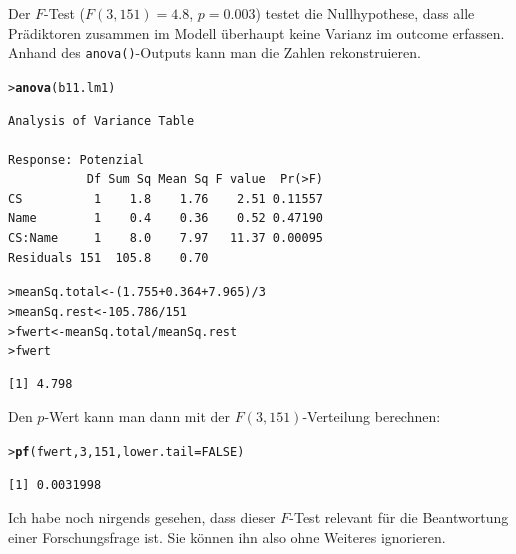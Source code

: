 \documentclass[oneside, 10pt]{book}\usepackage[]{graphicx}\usepackage[]{xcolor}
\makeatletter
\newcommand{\hlnum}[1]{\textcolor[rgb]{0.686,0.059,0.569}{#1}}%
\newcommand{\hlopt}[1]{\textcolor[rgb]{0,0,0}{#1}}%
\newcommand{\hlstd}[1]{\textcolor[rgb]{0.345,0.345,0.345}{#1}}%
\newcommand{\hlkwb}[1]{\textcolor[rgb]{0.69,0.353,0.396}{#1}}%
\newcommand{\hlkwc}[1]{\textcolor[rgb]{0.333,0.667,0.333}{#1}}%
\newcommand{\hlkwd}[1]{\textcolor[rgb]{0.737,0.353,0.396}{\textbf{#1}}}%
\newenvironment{kframe}{%
 \def\at@end@of@kframe{}%
 \ifinner\ifhmode%
  \def\at@end@of@kframe{\end{minipage}}%
  \begin{minipage}{\columnwidth}%
 \fi\fi%
 \def\FrameCommand##1{\hskip\@totalleftmargin \hskip-\fboxsep
 \colorbox{shadecolor}{##1}\hskip-\fboxsep
     \hskip-\linewidth \hskip-\@totalleftmargin \hskip\columnwidth}%
 \MakeFramed {\advance\hsize-\width
   \@totalleftmargin\z@ \linewidth\hsize
   \@setminipage}}%
 {\par\unskip\endMakeFramed%
 \at@end@of@kframe}
\newenvironment{knitrout}{}{} %
\makeatother
\begin{document}
Der $F$-Test ($F(3, 151) = 4.8$, $p = 0.003$)
testet die Nullhypothese, dass alle Prädiktoren zusammen
im Modell überhaupt keine Varianz im outcome
erfassen. Anhand des \texttt{anova()}-Outputs kann
man die Zahlen rekonstruieren.
\begin{knitrout}
\color{fgcolor}\begin{kframe}
\begin{alltt}
\hlstd{> }\hlkwd{anova}\hlstd{(b11.lm1)}
\end{alltt}
\begin{verbatim}
Analysis of Variance Table

Response: Potenzial
           Df Sum Sq Mean Sq F value  Pr(>F)
CS          1    1.8    1.76    2.51 0.11557
Name        1    0.4    0.36    0.52 0.47190
CS:Name     1    8.0    7.97   11.37 0.00095
Residuals 151  105.8    0.70                
\end{verbatim}
\begin{alltt}
\hlstd{> }\hlstd{meanSq.total} \hlkwb{<-} \hlstd{(}\hlnum{1.755} \hlopt{+} \hlnum{0.364} \hlopt{+} \hlnum{7.965}\hlstd{)} \hlopt{/} \hlnum{3}
\hlstd{> }\hlstd{meanSq.rest} \hlkwb{<-} \hlnum{105.786} \hlopt{/} \hlnum{151}
\hlstd{> }\hlstd{fwert} \hlkwb{<-} \hlstd{meanSq.total} \hlopt{/} \hlstd{meanSq.rest}
\hlstd{> }\hlstd{fwert}
\end{alltt}
\begin{verbatim}
[1] 4.798
\end{verbatim}
\end{kframe}
\end{knitrout}

Den $p$-Wert kann man dann mit der $F(3, 151)$-Verteilung
berechnen:
\begin{knitrout}
\color{fgcolor}\begin{kframe}
\begin{alltt}
\hlstd{> }\hlkwd{pf}\hlstd{(fwert,} \hlnum{3}\hlstd{,} \hlnum{151}\hlstd{,} \hlkwc{lower.tail} \hlstd{=} \hlnum{FALSE}\hlstd{)}
\end{alltt}
\begin{verbatim}
[1] 0.0031998
\end{verbatim}
\end{kframe}
\end{knitrout}

Ich habe noch nirgends gesehen, dass dieser $F$-Test
relevant für die Beantwortung einer Forschungsfrage ist.
Sie können ihn also ohne Weiteres ignorieren.
\end{document}
